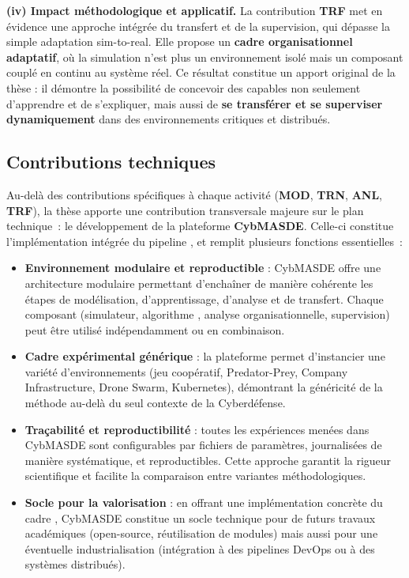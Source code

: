\medskip
\noindent
\textbf{(iv) Impact méthodologique et applicatif.}
La contribution \textbf{TRF} met en évidence une approche intégrée du transfert et de la supervision, qui dépasse la simple adaptation sim-to-real.
Elle propose un \textbf{cadre organisationnel adaptatif}, où la simulation n'est plus un environnement isolé mais un composant couplé en continu au système réel.
Ce résultat constitue un apport original de la thèse : il démontre la possibilité de concevoir des  capables non seulement d'apprendre et de s'expliquer, mais aussi de \textbf{se transférer et se superviser dynamiquement} dans des environnements critiques et distribués.

\subsection*{Contributions techniques}

Au-delà des contributions spécifiques à chaque activité (\textbf{MOD}, \textbf{TRN}, \textbf{ANL}, \textbf{TRF}), la thèse apporte une contribution transversale majeure sur le plan technique~: le développement de la plateforme \textbf{CybMASDE}.
Celle-ci constitue l'implémentation intégrée du pipeline , et remplit plusieurs fonctions essentielles~:

\begin{itemize}
  \item \textbf{Environnement modulaire et reproductible} : CybMASDE offre une architecture modulaire permettant d'enchaîner de manière cohérente les étapes de modélisation, d'apprentissage, d'analyse et de transfert. Chaque composant (simulateur, algorithme , analyse organisationnelle, supervision) peut être utilisé indépendamment ou en combinaison.
  \item \textbf{Cadre expérimental générique} : la plateforme permet d'instancier une variété d'environnements (jeu coopératif, Predator-Prey, Company Infrastructure, Drone Swarm, Kubernetes), démontrant la généricité de la méthode au-delà du seul contexte de la Cyberdéfense.
  \item \textbf{Traçabilité et reproductibilité} : toutes les expériences menées dans CybMASDE sont configurables par fichiers de paramètres, journalisées de manière systématique, et reproductibles. Cette approche garantit la rigueur scientifique et facilite la comparaison entre variantes méthodologiques.
  \item \textbf{Socle pour la valorisation} : en offrant une implémentation concrète du cadre , CybMASDE constitue un socle technique pour de futurs travaux académiques (open-source, réutilisation de modules) mais aussi pour une éventuelle industrialisation (intégration à des pipelines DevOps ou à des systèmes distribués).
\end{itemize}

